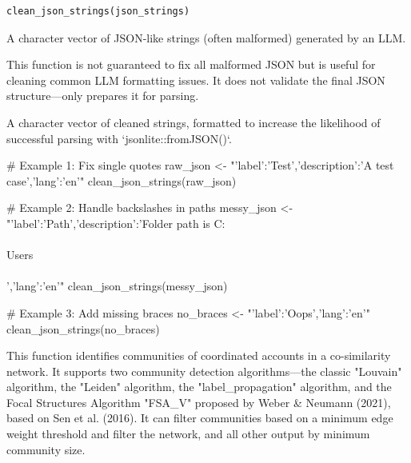 \documentclass[a4paper]{book}
\begin{document}
%
\begin{Usage}
\begin{verbatim}
clean_json_strings(json_strings)
\end{verbatim}
\end{Usage}
%
\begin{Arguments}
\begin{ldescription}
\item[\code{json\_strings}] A character vector of JSON-like strings (often malformed) generated by an LLM.
\end{ldescription}
\end{Arguments}
%
\begin{Details}
This function is not guaranteed to fix all malformed JSON but is useful for cleaning common
LLM formatting issues. It does not validate the final JSON structure—only prepares it for parsing.
\end{Details}
%
\begin{Value}
A character vector of cleaned strings, formatted to increase the likelihood of successful parsing
with `jsonlite::fromJSON()`.
\end{Value}
%
\begin{SeeAlso}
\end{SeeAlso}
%
\begin{Examples}
\begin{ExampleCode}
# Example 1: Fix single quotes
raw_json <- "{'label':'Test','description':'A test case','lang':'en'}"
clean_json_strings(raw_json)

# Example 2: Handle backslashes in paths
messy_json <- "{'label':'Path','description':'Folder path is C:\\\\Users\\\\','lang':'en'}"
clean_json_strings(messy_json)

# Example 3: Add missing braces
no_braces <- "'label':'Oops','lang':'en'"
clean_json_strings(no_braces)

\end{ExampleCode}
\end{Examples}
%
\begin{Description}
This function identifies communities of coordinated accounts in a co-similarity network. 
It supports two community detection algorithms—the classic "Louvain" algorithm, the "Leiden" algorithm, the "label\_propagation" algorithm,
and the Focal Structures Algorithm "FSA\_V" proposed by Weber \& Neumann (2021), based on Sen et al. (2016). 
It can filter communities based on a minimum edge weight threshold and filter the network, and all other output by minimum community size.
\end{Description}
\end{document}

